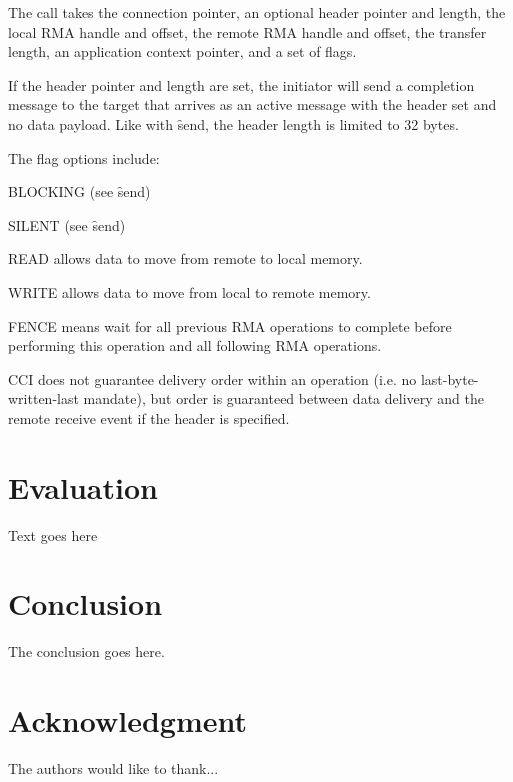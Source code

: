 \documentclass[conference]{IEEEtran}
\begin{document}
The call takes the connection pointer, an optional header pointer and length, the local
RMA handle and offset, the remote RMA handle and offset, the transfer length, an
application context pointer, and a set of flags.

If the header pointer and length are set, the initiator will send a completion message to
the target that arrives as an active message with the header set and no data payload. Like
with \f{send}, the header length is limited to 32 bytes.

The flag options include:

\begin{description}
\item BLOCKING (see \f{send})
\item SILENT (see \f{send})
\item READ allows data to move from remote to local memory.
\item WRITE allows data to move from local to remote memory.
\item FENCE means wait for all previous RMA operations to complete before performing this
operation and all following RMA operations.
\end{description}

CCI does not guarantee delivery order within an operation (i.e. no last-byte-written-last
mandate), but order is guaranteed between data delivery and the remote receive event if
the header is specified.

\section{Evaluation}
Text goes here

\section{Conclusion}
The conclusion goes here.


\section*{Acknowledgment}

The authors would like to thank...


\end{document}
